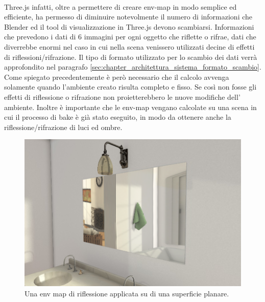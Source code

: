 \\
Three.js infatti, oltre a permettere di creare env-map in modo semplice ed efficiente, ha permesso di diminuire notevolmente il numero di informazioni che Blender ed il tool di visualizzazione in Three.js devono scambiarsi. Informazioni che prevedono i dati di 6 immagini per ogni oggetto che riflette o rifrae, dati che diverrebbe enormi nel caso in cui nella scena venissero utilizzati decine di effetti di riflessioni/rifrazione. Il tipo di formato utilizzato per lo scambio dei dati verrà approfondito nel paragrafo \ref{sec:chapter_architettura_sistema_formato_scambio}.
\\
Come spiegato precedentemente è però necessario che il calcolo avvenga solamente quando l’ambiente creato risulta completo e fisso. Se così non fosse gli effetti di riflessione o rifrazione non proietterebbero le nuove modifiche dell’ ambiente.
Inoltre è importante che le env-map vengano calcolate su una scena in cui il processo di bake è già stato eseguito, in modo da ottenere anche la riflessione/rifrazione di luci ed ombre.
\\
\begin{figure}[htb]
 \centering
 \includegraphics[width=1\linewidth]{images/chapter_lrl/lrl_envspecchio.png}\hfill
 \caption[Env map di riflessione]{Una env map di riflessione applicata su di una superficie planare.}
 \label{fig:lrl_envspecchio}
\end{figure}

